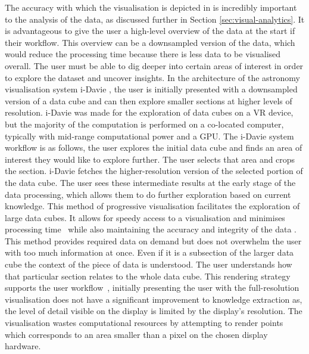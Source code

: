 The accuracy with which the visualisation is depicted in is incredibly important to the analysis of the data, as discussed further in Section \ref{sec:visual-analytics}.
It is advantageous to give the user a high-level overview of the data at the start if their workflow\cite{Li2016, Lowe2020, Zhao2017}.
This overview can be a downsampled version of the data, which would reduce the processing time because there is less data to be visualised overall\cite{Masiane2019}.
The user must be able to dig deeper into certain areas of interest in order to explore the dataset and uncover insights.
In the architecture of the astronomy visualisation system i-Davie \cite{Marchetti2020}, the user is initially presented with a downsampled version of a data cube and can then explore smaller sections at higher levels of resolution.
i-Davie was made for the exploration of data cubes on a VR device, but the majority of the computation is performed on a co-located computer, typically with mid-range computational power and a GPU.
The i-Davie system workflow is as follows, the user explores the initial data cube and finds an area of interest they would like to explore further.
The user selects that area and crops the section.
i-Davie fetches the higher-resolution version of the selected portion of the data cube.
The user sees these intermediate results at the early stage of the data processing, which allows them to do further exploration based on current knowledge.
This method of progressive visualisation facilitates the exploration of large data cubes.
It allows for speedy access to a visualisation and minimises processing time~\cite{Zhao2017} while also maintaining the accuracy and integrity of the data \cite{Masiane2019}.
This method provides required data on demand but does not overwhelm the user with too much information at once.
Even if it is a subsection of the larger data cube the context of the piece of data is understood.
The user understands how that particular section relates to the whole data cube.
This rendering strategy supports the user workflow~\cite{Hassan2011},
initially presenting the user with the full-resolution visualisation does not have a significant improvement to knowledge extraction as, the level of detail visible on the display is limited by the display's resolution. 
The visualisation wastes computational resources by attempting to render points which corresponds to an area smaller than a pixel on the chosen display hardware.
